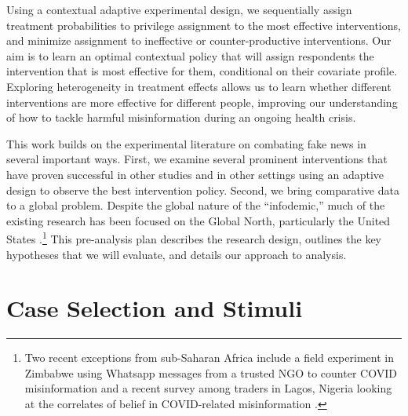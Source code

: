 \documentclass[letterpaper, 12pt, parskip=full,]{scrartcl}
\begin{document}
Using a contextual adaptive experimental design, we sequentially assign treatment probabilities to privilege assignment to the most effective interventions, and minimize assignment to ineffective or counter-productive interventions. Our aim is to learn an optimal contextual policy that will assign respondents the intervention that is most effective for them, conditional on their covariate profile. Exploring heterogeneity in treatment effects allows us to learn whether different interventions are more effective for different people, improving our understanding of how to tackle harmful misinformation during an ongoing health crisis. 

This work builds on the experimental literature on combating fake news in several important ways. First, we examine several prominent interventions that have proven successful in other studies and in other settings using an adaptive design to observe the best intervention policy. Second, we bring comparative data to a global problem. Despite the global nature of the ``infodemic,'' much of the existing research has been focused on the Global North, particularly the United States \citep{pennycook2020fighting, bursztyn2020misinformation}.\footnote{Two recent exceptions from sub-Saharan Africa include a field experiment in Zimbabwe using Whatsapp messages from a trusted NGO  to counter COVID misinformation \citep{bowles2020center} and a recent survey among traders in Lagos, Nigeria looking at the correlates of belief in COVID-related misinformation \citep{Grossman2020}.} This pre-analysis plan describes the research design, outlines the key hypotheses that we will evaluate, and details our approach to analysis.




\section{Case Selection and Stimuli}
\end{document}
